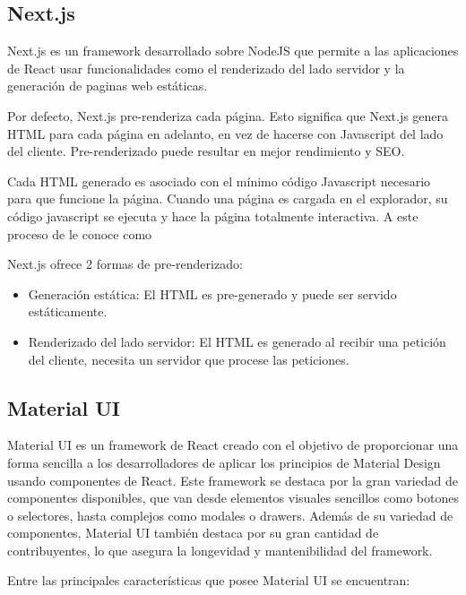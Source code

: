 \subsection{Next.js}

Next.js es un framework desarrollado sobre NodeJS que permite a las aplicaciones de React usar funcionalidades como el renderizado del lado servidor y la generación de paginas web estáticas.

Por defecto, Next.js pre-renderiza cada página. Esto significa que Next.js genera HTML para cada página en adelanto, en vez de hacerse con Javascript del lado del cliente. Pre-renderizado puede resultar en mejor rendimiento y SEO.

Cada HTML generado es asociado con el mínimo código Javascript necesario para que funcione la página. Cuando una página es cargada en el explorador, su código javascript se ejecuta y hace la página totalmente interactiva. A este proceso de le conoce como 

Next.js ofrece 2 formas de pre-renderizado:

\begin{itemize}
  \item Generación estática: El HTML es pre-generado y puede ser servido estáticamente.
  \item Renderizado del lado servidor: El HTML es generado al recibir una petición del cliente, necesita un servidor que procese las peticiones.
\end{itemize}

\subsection{Material UI}

Material UI es un framework de React creado con el objetivo de proporcionar una forma sencilla a los desarrolladores de aplicar los principios de Material Design \cite{MaterialDesignPrinciples} usando componentes de React. Este framework se destaca por la gran variedad de componentes disponibles, que van desde elementos visuales sencillos como botones o selectores, hasta complejos como modales o drawers. Además de su variedad de componentes, Material UI también destaca por su gran cantidad de contribuyentes, lo que asegura la longevidad y mantenibilidad del framework.

Entre las principales características que posee Material UI se encuentran:

